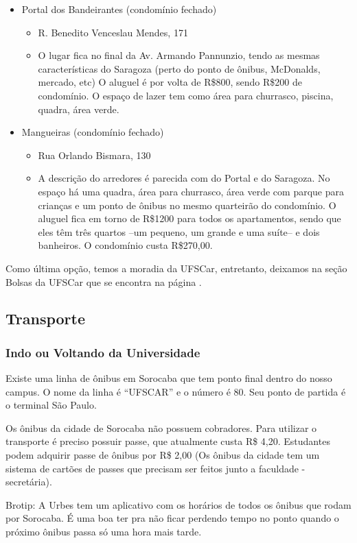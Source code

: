 \begin{itemize}
  \item Portal dos Bandeirantes (condomínio fechado)
    \begin{itemize}
      \item R. Benedito Venceslau Mendes, 171
      \item O lugar fica no final da Av. Armando Pannunzio, tendo as mesmas características do Saragoza (perto do ponto de ônibus, McDonalds, mercado, etc) O aluguel é por volta de R\$800, sendo R\$200 de condomínio. O espaço de lazer tem como área para churrasco, piscina, quadra, área verde.
    \end{itemize}
  \item Mangueiras (condomínio fechado)
    \begin{itemize}
      \item Rua Orlando Bismara, 130
      \item A descrição do arredores é parecida com do Portal e do Saragoza. No espaço há uma quadra, área para churrasco, área verde com parque para crianças e um ponto de ônibus no mesmo quarteirão do condomínio. O aluguel fica em torno de R\$1200 para todos os apartamentos, sendo que eles têm três quartos --um pequeno, um grande e uma suíte-- e dois banheiros. O condomínio custa R\$270,00.
    \end{itemize}
\end{itemize}

Como última opção, temos a moradia da UFSCar, entretanto,  deixamos na seção Bolsas da UFSCar que se encontra na página \pageref{moradia}.

\subsection{Transporte}
\subsubsection{Indo ou Voltando da Universidade}
Existe uma linha de ônibus em Sorocaba que tem ponto final dentro do nosso campus. O nome da linha é “UFSCAR” e o número é 80. Seu ponto de partida é o terminal São Paulo.

Os ônibus da cidade de Sorocaba não possuem cobradores. Para utilizar o transporte é preciso possuir passe, que atualmente custa R\$ 4,20. Estudantes podem adquirir passe de ônibus por R\$ 2,00 (Os ônibus da cidade tem um sistema de cartões de passes que precisam ser feitos junto a faculdade - secretária).

Brotip: A Urbes tem um aplicativo com os horários de todos os ônibus que rodam por Sorocaba. É uma boa ter pra não ficar perdendo tempo no ponto quando o próximo ônibus passa só uma hora mais tarde.

